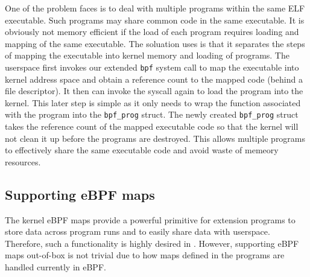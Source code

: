 One of the problem \projname{} faces is to deal with multiple programs within
    the same ELF executable.
Such programs may share common code in the same executable.
It is obviously not memory efficient if the load of each program requires
    loading and mapping of the same executable.
The soluation \projname{} uses is that it separates the steps of mapping the
    executable into kernel memory and loading of programs.
The userspace first invokes our extended \texttt{bpf} system call to map the
    executable into kernel address space and obtain a reference count to the
    mapped code (behind a file descriptor).
It then can invoke the syscall again to load the program into the kernel.
This later step is simple as it only needs to wrap the function associated with
    the \projname{} program into the \texttt{bpf\_prog} struct.
The newly created \texttt{bpf\_prog} struct takes the reference count of the
    mapped executable code so that the kernel will not clean it up before the
    programs are destroyed.
This allows multiple programs to effectively share the same executable code and
    avoid waste of memeory resources.

\subsection{Supporting eBPF maps}
\label{impl:map}
%
%
The kernel eBPF maps provide a powerful primitive for extension programs to
    store data across program runs and to easily share data with userspace.
Therefore, such a functionality is highly desired in \projname{}.
However, supporting eBPF maps out-of-box is not trivial due to how maps defined
    in the programs are handled currently in eBPF.

